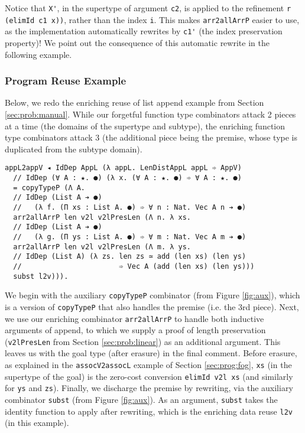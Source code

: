 \documentclass[acmsmall]{acmart}\settopmatter{}
\newcommand{\refsec}[1]{Section \ref{sec:#1}}
\newcommand{\reffig}[1]{Figure \ref{fig:#1}}
\begin{document}
Notice that \verb;X';, in the supertype  of argument \verb;c2;, is
applied to the refinement \verb;r (elimId c1 x));,
rather than the index \verb;i;.
This makes \verb;arr2allArrP; easier to use, as the
implementation automatically rewrites by \verb;c1'; (the index
preservation property)! We point out the consequence of this automatic
rewrite in the following example.

\subsubsection{Program Reuse Example}

Below, we redo the enriching reuse of list append example from
\refsec{prob:manual}. While our forgetful function type combinators
attack 2 pieces at a time (the domains of the supertype and subtype),
the enriching function type combinators attack 3 (the additional piece
being the premise, whose type is duplicated from the subtype domain).
\begin{verbatim}
appL2appV ◂ IdDep AppL (λ appL. LenDistAppL appL ➾ AppV)
  // IdDep (∀ A : ★. ●) (λ x. (∀ A : ★. ●) ➾ ∀ A : ★. ●)
  = copyTypeP (Λ A. 
  // IdDep (List A ➔ ●) 
  //   (λ f. (Π xs : List A. ●) ➾ ∀ n : Nat. Vec A n ➔ ●)
  arr2allArrP len v2l v2lPresLen (Λ n. λ xs. 
  // IdDep (List A ➔ ●) 
  //   (λ g. (Π ys : List A. ●) ➾ ∀ m : Nat. Vec A m ➔ ●)
  arr2allArrP len v2l v2lPresLen (Λ m. λ ys.
  // IdDep (List A) (λ zs. len zs ≃ add (len xs) (len ys)
  //                       ➾ Vec A (add (len xs) (len ys)))
  subst l2v))).
\end{verbatim}
We begin with the auxiliary \texttt{copyTypeP} combinator (from
\reffig{aux}), which is a version of \texttt{copyTypeP} that also
handles the premise (i.e. the 3rd piece). Next, we use our enriching
combinator \texttt{arr2allArrP} to handle both inductive arguments of
append, to which we supply a proof of length preservation
(\verb;v2lPresLen; from \refsec{prob:linear}) as an additional
argument. This leaves us with the goal type (after erasure) in the
final comment.  Before erasure, as explained in the
\verb;assocV2assocL; example of \refsec{prog:fog},
\verb;xs; (in the supertype of the goal) is the
zero-cost conversion \verb;elimId v2l xs; (and similarly for \verb;ys;
and \verb;zs;).  Finally, we discharge the premise by rewriting, via
the auxiliary combinator \verb;subst; (from \reffig{aux}). As an
argument, \verb;subst; takes the identity function to apply after
rewriting, which is the enriching data reuse \verb;l2v; (in this
example).
\end{document}
